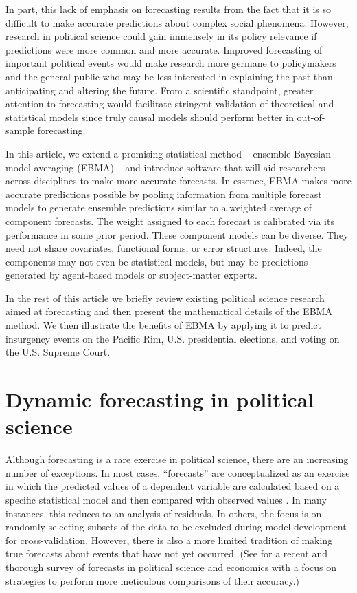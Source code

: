 \documentclass[12pt,fullpage,endnotes]{article}
\begin{document}
In part, this lack of emphasis on forecasting results from the fact
that it is so difficult to make accurate predictions about complex
social phenomena. However, research in political science could gain
immensely in its policy relevance if predictions were more common and
more accurate.  Improved forecasting of important political events
would make research more germane to policymakers and the general
public who may be less interested in explaining the past than
anticipating and altering the future.  From a scientific standpoint,
greater attention to forecasting would facilitate stringent validation
of theoretical and statistical models since truly causal models should
perform better in out-of-sample forecasting.

In this article, we extend a promising statistical method -- ensemble
Bayesian model averaging (EBMA) -- and introduce software that will
aid researchers across disciplines to make more accurate forecasts.
In essence, EBMA makes more accurate predictions possible by pooling
information from multiple forecast models to generate ensemble
predictions similar to a weighted average of component forecasts. The
weight assigned to each forecast is calibrated via its performance in
some prior period.  These component models can be diverse.  They need
not share covariates, functional forms, or error structures. Indeed,
the components may not even be statistical models, but may be
predictions generated by agent-based models or subject-matter experts.

In the rest of this article we briefly review
existing political science research aimed at forecasting and then
present the mathematical details of the EBMA method. We then
illustrate the benefits of EBMA by applying it to predict insurgency
events on the Pacific Rim, U.S. presidential elections, and voting on
the U.S. Supreme Court.

\section{Dynamic forecasting in political science}
Although forecasting is a rare exercise in political science, there
are an increasing number of exceptions.  In most cases, ``forecasts''
are conceptualized as an exercise in which the predicted values of a
dependent variable are calculated based on a specific statistical
model and then compared with observed values
\citep[e.g.,][]{Hildebrand:etal:1976}. In many instances, this reduces
to an analysis of residuals.  In others, the focus is on randomly
selecting subsets of the data to be excluded during model development
for cross-validation.  However, there is also a more limited tradition
of making true forecasts about events that have not yet occurred.
(See \citet{brandt:freeman:schrodt:2011} for a recent and thorough
survey of forecasts in political science and economics with a focus on
strategies to perform more meticulous comparisons of their accuracy.)
\end{document}
